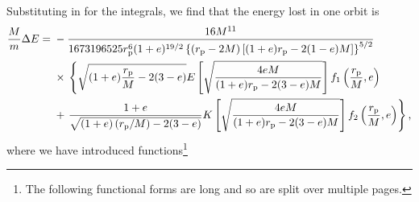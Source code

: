 Substituting in for the integrals, we find that the energy lost in one orbit is
\begin{align}
\dfrac{M}{m} \Delta E = {} & -\dfrac{16 M^{11}}{1673196525 r_\mathrm{p}^{6} (1 + e)^{{19}/{2}} \left\{\left(r_\mathrm{p} - 2 M\right)\left[(1 + e)r_\mathrm{p} - 2(1 - e)M\right]\right\}^{{5}/{2}}} \nonumber \\
 {} & \times {} \left\{\sqrt{( 1+ e)\dfrac{r_\mathrm{p}}{M} - 2(3 - e)} E\left[\sqrt{\dfrac{4 e M}{(1+e) r_\mathrm{p} - 2(3 - e)M}}\right] f_{1}\left(\dfrac{r_\mathrm{p}}{M}, e\right) \right. \nonumber \\
   {} & + \left. \dfrac{1 + e}{\sqrt{(1 + e)\left(r_\mathrm{p}/M\right)- 2 (3 - e)}} K\left[\sqrt{\dfrac{4 e M}{(1+e) r_\mathrm{p} - 2(3 - e)M}}\right] f_{2} \left(\dfrac{r_\mathrm{p}}{M}, e\right)\right\},
\end{align}
where we have introduced functions\footnote{The following functional forms are long and so are split over multiple pages.}
